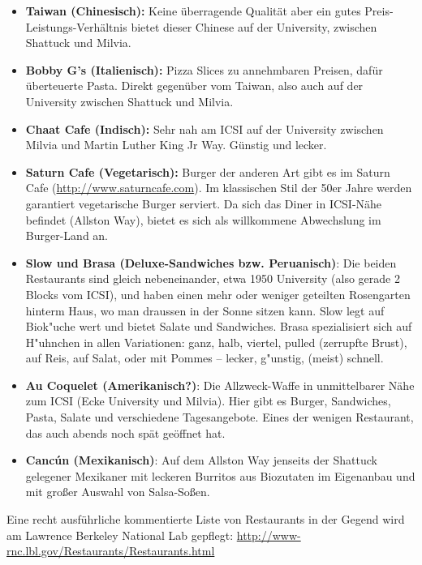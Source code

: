 \documentclass[a4paper]{scrreprt}
\begin{document}
\begin{itemize}
	\item \textbf{Taiwan (Chinesisch):} Keine überragende Qualität aber ein gutes Preis-Leistungs-Verhältnis bietet dieser Chinese auf der University, zwischen Shattuck und Milvia.

	\item \textbf{Bobby G's  (Italienisch):} Pizza Slices zu annehmbaren Preisen, dafür überteuerte Pasta. Direkt gegenüber vom Taiwan, also auch auf der University zwischen Shattuck und Milvia.
  
  \item \textbf{Chaat Cafe (Indisch):} Sehr nah am ICSI auf der University zwischen Milvia und Martin Luther King Jr Way. Günstig und lecker.   
  
  \item \textbf{Saturn Cafe (Vegetarisch):} Burger der anderen Art gibt es im Saturn Cafe (\url{http://www.saturncafe.com}). Im klassischen Stil der 50er Jahre werden garantiert vegetarische Burger serviert. Da sich das Diner in ICSI-Nähe befindet (Allston Way), bietet es sich als willkommene Abwechslung im Burger-Land an.
  
  \item \textbf{Slow und Brasa (Deluxe-Sandwiches bzw. Peruanisch)}: Die beiden Restaurants sind gleich nebeneinander, etwa 1950 University (also gerade 2 Blocks vom ICSI), und haben einen mehr oder weniger geteilten Rosengarten hinterm Haus, wo man draussen in der Sonne sitzen kann. Slow legt auf Biok"uche wert und bietet Salate und Sandwiches. Brasa spezialisiert sich auf H"uhnchen in allen Variationen: ganz, halb, viertel, pulled (zerrupfte Brust), auf Reis, auf Salat, oder mit Pommes -- lecker, g"unstig, (meist) schnell.
  
  	\item \textbf{Au Coquelet (Amerikanisch?)}: Die Allzweck-Waffe in unmittelbarer Nähe zum ICSI (Ecke University und Milvia). Hier gibt es Burger, Sandwiches, Pasta, Salate und verschiedene Tagesangebote. Eines der wenigen Restaurant, das auch abends noch spät geöffnet hat.

\item \textbf{Cancún (Mexikanisch)}: Auf dem Allston Way jenseits der Shattuck gelegener Mexikaner mit
leckeren Burritos aus Biozutaten im Eigenanbau und mit großer Auswahl von Salsa-Soßen.

\end{itemize}

Eine recht ausführliche kommentierte Liste von Restaurants in der Gegend wird am Lawrence Berkeley National Lab gepflegt: \url{http://www-rnc.lbl.gov/Restaurants/Restaurants.html} 
\end{document}
